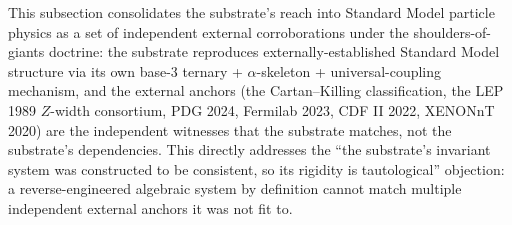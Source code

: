 \documentclass[11pt,a4paper]{amsart}
\theoremstyle{plain}
\theoremstyle{definition}
\begin{document}
This subsection consolidates the substrate's reach into Standard Model particle physics as a set of independent external corroborations under the shoulders-of-giants doctrine: the substrate reproduces externally-established Standard Model structure via its own base-3 ternary + $\alpha$-skeleton + universal-coupling mechanism, and the external anchors (the Cartan--Killing classification, the LEP 1989 $Z$-width consortium, PDG 2024, Fermilab 2023, CDF II 2022, XENONnT 2020) are the independent witnesses that the substrate matches, not the substrate's dependencies. This directly addresses the ``the substrate's invariant system was constructed to be consistent, so its rigidity is tautological'' objection: a reverse-engineered algebraic system by definition cannot match multiple independent external anchors it was not fit to.
\end{document}
